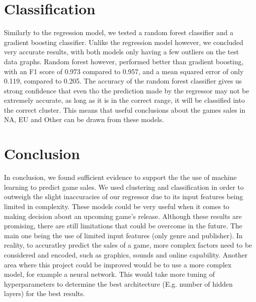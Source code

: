 \documentclass[english]{article}
\begin{document}
\section{Classification}
Similarly to the regression model, we tested a random forest classifier and a gradient boosting classifier. Unlike the regression model however, we concluded very accurate results, with both models only having a few outliers on the test data graphs. Random forest however, performed better than gradient boosting, with an F1 score of 0.973 compared to 0.957, and a mean squared error of only 0.119, compared to 0.205. The accuracy of the random forest classifier gives us strong confidence that even tho the prediction made by the regressor may not be extremely accurate, as long as it is in the correct range, it will be classified into the correct cluster. This means that useful conclusions about the games sales in NA, EU and Other can be drawn from these models.


\section{Conclusion}
In conclusion, we found sufficient evidence to support the the use of machine learning to predict game sales. We used clustering and classification in order to outweigh the slight inaccuracies of our regressor due to its input features being limited in complexity. These models could be very useful when it comes to making decision about an upcoming game's release. Although these results are promising, there are still limitations that could be overcome in the future. The main one being the use of limited input features (only genre and publisher). In reality, to accuratley predict the sales of a game, more complex factors need to be considered and encoded, such as graphics, sounds and online capability. Another area where this project could be improved would be to use a more complex model, for example a neural network. This would take more tuning of hyperparameters to determine the best architecture (E.g. number of hidden layers) for the best results.

\newpage 

\end{document}
